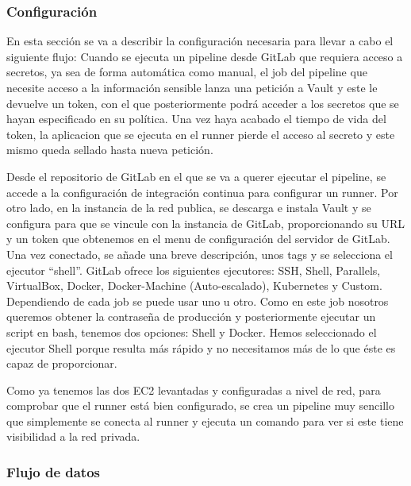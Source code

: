 \documentclass[12pt]{report} %
\begin{document}

\subsubsection{Configuración}

En esta sección se va a describir la configuración necesaria para llevar a cabo
el siguiente flujo:
Cuando se ejecuta un \gls{pipeline} desde GitLab que requiera acceso a secretos,
ya sea de forma automática como manual, el job del \gls{pipeline} que necesite
acceso a la información sensible lanza una petición a Vault y este le devuelve
un token, con el que posteriormente podrá acceder a los secretos que se hayan 
especificado en su política.
Una vez haya acabado el tiempo de vida del token, la aplicacion que se ejecuta
en el \gls{runner} pierde el acceso al secreto y este mismo queda sellado hasta
nueva petición.

Desde el repositorio de GitLab en el que se va a querer ejecutar el
\gls{pipeline}, se accede a la configuración de integración continua para
configurar un \gls{runner}.
Por otro lado, en la instancia de la red publica, se descarga e instala Vault y
se configura para que se vincule con la instancia de GitLab,
proporcionando su URL y un token que obtenemos en el menu de configuración
del servidor de GitLab.
Una vez conectado, se añade una breve descripción, unos tags y se selecciona el
ejecutor ``shell''.
GitLab ofrece los siguientes ejecutores: SSH, Shell, Parallels, VirtualBox,
Docker, Docker-Machine (Auto-escalado), Kubernetes y Custom.
Dependiendo de cada \gls{job} se puede usar uno u otro.
Como en este \gls{job} nosotros queremos obtener la contraseña de producción
y posteriormente ejecutar un script en bash, tenemos dos opciones: Shell y
Docker.
Hemos seleccionado el ejecutor Shell porque resulta más rápido y no necesitamos
más de lo que éste es capaz de proporcionar.
 
Como ya tenemos las dos \gls{EC2} levantadas y configuradas a nivel de red, 
para comprobar que el \gls{runner} está bien configurado, se crea un pipeline
muy sencillo que simplemente se conecta al runner y ejecuta un comando para ver
si este tiene visibilidad a la red privada.



\subsubsection{Flujo de datos}
\end{document}
